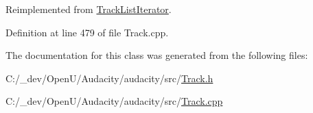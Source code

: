 Reimplemented from \hyperlink{class_track_list_iterator_a4eea44fac9add00ff978213df1652441}{Track\+List\+Iterator}.



Definition at line 479 of file Track.\+cpp.



The documentation for this class was generated from the following files\+:\begin{DoxyCompactItemize}
\item 
C\+:/\+\_\+dev/\+Open\+U/\+Audacity/audacity/src/\hyperlink{src_2track_8h}{Track.\+h}\item 
C\+:/\+\_\+dev/\+Open\+U/\+Audacity/audacity/src/\hyperlink{src_2track_8cpp}{Track.\+cpp}\end{DoxyCompactItemize}
